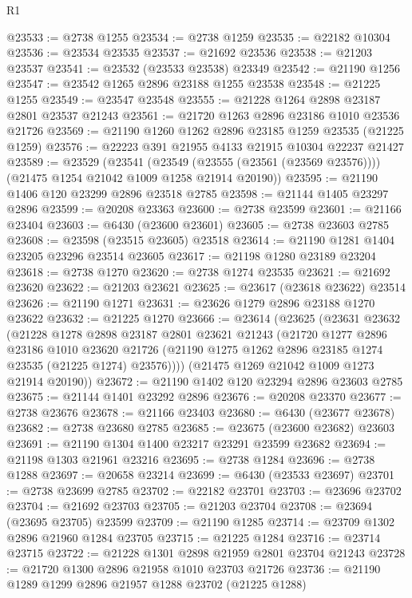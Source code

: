 \begin{lexlean}{R1}
\begin{coremodule}
@23533 := @2738 @1255
@23534 := @2738 @1259
@23535 := @22182 @10304
@23536 := @23534 @23535
@23537 := @21692 @23536
@23538 := @21203 @23537
@23541 := @23532 (@23533 @23538) @23349
@23542 := @21190 @1256
@23547 := @23542 @1265 @2896 @23188 @1255 @23538
@23548 := @21225 @1255
@23549 := @23547 @23548
@23555 := @21228 @1264 @2898 @23187 @2801 @23537 @21243
@23561 := @21720 @1263 @2896 @23186 @1010 @23536 @21726
@23569 := @21190 @1260 @1262 @2896 @23185 @1259 @23535 (@21225 @1259)
@23576 := @22223 @391 @21955 @4133 @21915 @10304 @22237 @21427
@23589 := @23529
    (@23541
      (@23549 (@23555 (@23561 (@23569 @23576))))
      (@21475 @1254 @21042 @1009 @1258 @21914 @20190))
@23595 := @21190 @1406 @120 @23299 @2896 @23518 @2785
@23598 := @21144 @1405 @23297 @2896
@23599 := @20208 @23363
@23600 := @2738 @23599
@23601 := @21166 @23404
@23603 := @6430 (@23600 @23601)
@23605 := @2738 @23603 @2785
@23608 := @23598 (@23515 @23605) @23518
@23614 := @21190 @1281 @1404 @23205 @23296 @23514 @23605
@23617 := @21198 @1280 @23189 @23204
@23618 := @2738 @1270
@23620 := @2738 @1274 @23535
@23621 := @21692 @23620
@23622 := @21203 @23621
@23625 := @23617 (@23618 @23622) @23514
@23626 := @21190 @1271
@23631 := @23626 @1279 @2896 @23188 @1270 @23622
@23632 := @21225 @1270
@23666 := @23614
    (@23625
      (@23631
        @23632
        (@21228
          @1278
          @2898
          @23187
          @2801
          @23621
          @21243
          (@21720
            @1277
            @2896
            @23186
            @1010
            @23620
            @21726
            (@21190 @1275 @1262 @2896 @23185 @1274 @23535 (@21225 @1274) @23576))))
      (@21475 @1269 @21042 @1009 @1273 @21914 @20190))
@23672 := @21190 @1402 @120 @23294 @2896 @23603 @2785
@23675 := @21144 @1401 @23292 @2896
@23676 := @20208 @23370
@23677 := @2738 @23676
@23678 := @21166 @23403
@23680 := @6430 (@23677 @23678)
@23682 := @2738 @23680 @2785
@23685 := @23675 (@23600 @23682) @23603
@23691 := @21190 @1304 @1400 @23217 @23291 @23599 @23682
@23694 := @21198 @1303 @21961 @23216
@23695 := @2738 @1284
@23696 := @2738 @1288
@23697 := @20658 @23214
@23699 := @6430 (@23533 @23697)
@23701 := @2738 @23699 @2785
@23702 := @22182 @23701
@23703 := @23696 @23702
@23704 := @21692 @23703
@23705 := @21203 @23704
@23708 := @23694 (@23695 @23705) @23599
@23709 := @21190 @1285
@23714 := @23709 @1302 @2896 @21960 @1284 @23705
@23715 := @21225 @1284
@23716 := @23714 @23715
@23722 := @21228 @1301 @2898 @21959 @2801 @23704 @21243
@23728 := @21720 @1300 @2896 @21958 @1010 @23703 @21726
@23736 := @21190 @1289 @1299 @2896 @21957 @1288 @23702 (@21225 @1288)

\end{coremodule}
\end{lexlean}
